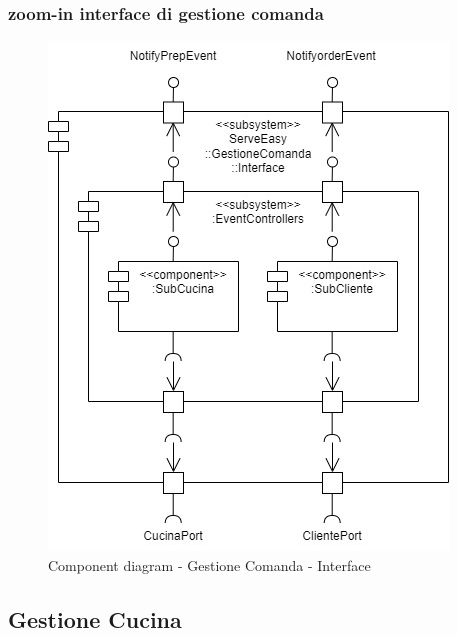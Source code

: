 \subsubsection{zoom-in interface di gestione comanda}
\begin{figure}[H]
	\centering
	\includegraphics[scale=0.5]{iterazione1/images/component_comanda_cucina-GestioneComanda__Interface.jpg}
	\caption{Component diagram - Gestione Comanda - Interface \label{fig:component_diagram_gestione_comanda_interface}}
\end{figure}

\subsection{Gestione Cucina}
